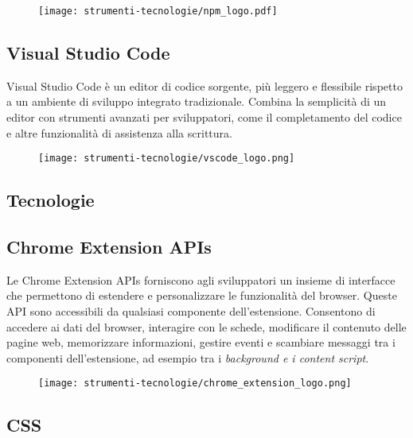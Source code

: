 \begin{figure}[H]
    \centering 
    \texttt{[image: strumenti-tecnologie/npm\_logo.pdf]} 
\end{figure}

\subsection*{Visual Studio Code}

\par Visual Studio Code è un editor di codice sorgente, più leggero e flessibile rispetto a un ambiente di sviluppo integrato tradizionale. Combina la semplicità di un editor con strumenti avanzati per sviluppatori, come il completamento del codice e altre funzionalità di assistenza alla scrittura.

\begin{figure}[H]
    \centering 
    \texttt{[image: strumenti-tecnologie/vscode\_logo.png]} 
\end{figure}

\subsection{Tecnologie}

\subsection*{Chrome Extension APIs}

\par Le Chrome Extension APIs forniscono agli sviluppatori un insieme di interfacce che permettono di estendere e personalizzare le funzionalità del browser. Queste API sono accessibili da qualsiasi componente dell’estensione. Consentono di accedere ai dati del browser, interagire con le schede, modificare il contenuto delle pagine web, memorizzare informazioni, gestire eventi e scambiare messaggi tra i componenti dell’estensione, ad esempio tra i \textit{background e i content script}.

\begin{figure}[H]
    \centering 
    \texttt{[image: strumenti-tecnologie/chrome\_extension\_logo.png]} 
\end{figure}

\subsection*{CSS}


